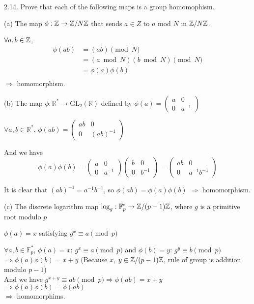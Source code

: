 2.14. Prove that each of the following maps is a group homomophism.

(a) The map $\phi: \mathbb{Z} \rightarrow \mathbb{Z}/N\mathbb{Z}$ that sends $a \in Z$ to $a$ mod $N$ in $\mathbb{Z}/N\mathbb{Z}$.
    
    $\forall a, b \in \mathbb{Z}$, 
    \begin{align*}
         \phi(ab) &= (ab) \pmod N\\
         &= (a \bmod N)(b \bmod N) \pmod N \\
         &= \phi(a)\phi(b) \\ 
    \end{align*}
   $\Rightarrow$ homomorphism.
    
(b) The map $\phi: \mathbb{R}^* \rightarrow \text{GL}_2(\mathbb{R})$ defined by $\phi(a) = \begin{pmatrix}a & 0 \\ 0 & a^{-1}\end{pmatrix}$
    
    $\forall a, b \in \mathbb{R}^*$, $\phi(ab)=\begin{pmatrix}ab & 0 \\ 0 & (ab)^{-1}\end{pmatrix}$
    
    And we have 
    \[ \phi(a)\phi(b) = \begin{pmatrix}a & 0 \\ 0 & a^{-1}\end{pmatrix}\begin{pmatrix}b & 0 \\ 0 & b^{-1}\end{pmatrix} = \begin{pmatrix}ab & 0 \\ 0 & a^{-1}b^{-1}\end{pmatrix}\]
    
    It is clear that $(ab)^{-1} = a^{-1}b^{-1}$, so $\phi(ab) = \phi(a)\phi(b)$ $\Rightarrow$ homomorphism.
    
(c) The discrete logarithm map $\log_g: \mathbb{F}_p^* \rightarrow \mathbb{Z}/(p-1)\mathbb{Z}$, where $g$ is a primitive root modulo $p$
    
    $\phi(a) = x$ satisfying $g^x \equiv a \pmod p$
    
    $\forall a, b \in \mathbb{F}_p^*$, $\phi(a) = x$: $g^x \equiv a \pmod p$ and $\phi(b) = y$: $g^y \equiv b \pmod p$ \\ $\Rightarrow \phi(a)\phi(b) = x+y$ (Because $x$, $y \in \mathbb{Z}/(p-1)\mathbb{Z}$, rule of group is addition modulo $p-1$) \\ And we have $g^{x+y} \equiv ab \pmod p \Rightarrow \phi(ab)=x+y$ \\ $\Rightarrow \phi(a)\phi(b) = \phi(ab)$ \\ $\Rightarrow$ homomorphims.

